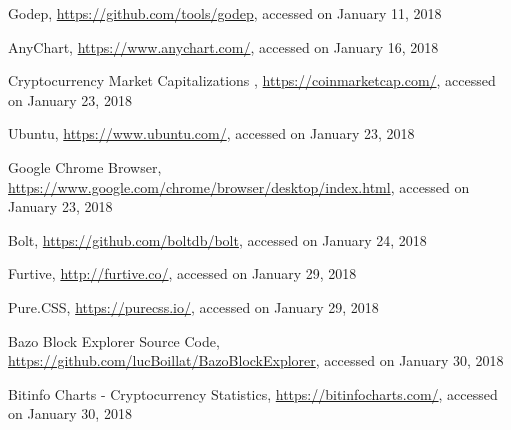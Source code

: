 \begin{thebibliography}{99}
 Godep, \url{https://github.com/tools/godep}, accessed on January 11, 2018

 AnyChart, \url{https://www.anychart.com/}, accessed on January 16, 2018

 Cryptocurrency Market Capitalizations , \url{https://coinmarketcap.com/}, accessed on January 23, 2018

 Ubuntu, \url{https://www.ubuntu.com/}, accessed on January 23, 2018

 Google Chrome Browser, \url{https://www.google.com/chrome/browser/desktop/index.html}, accessed on January 23, 2018

 Bolt, \url{https://github.com/boltdb/bolt}, accessed on January 24, 2018

 Furtive, \url{http://furtive.co/}, accessed on January 29, 2018

 Pure.CSS, \url{https://purecss.io/}, accessed on January 29, 2018

 Bazo Block Explorer Source Code, \url{https://github.com/lucBoillat/BazoBlockExplorer}, accessed on January 30, 2018

 Bitinfo Charts - Cryptocurrency Statistics, \url{https://bitinfocharts.com/}, accessed on January 30, 2018

\end{thebibliography}

